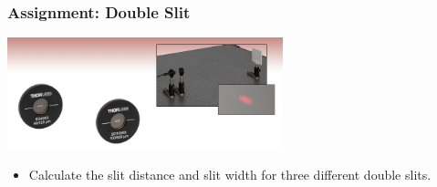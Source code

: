 \documentclass{beamer}
\begin{document}
\begin{frame}\frametitle{Assignment: Double Slit}

\begin{center}
\includegraphics[width=8cm]{fig/thorDouble.jpg}
\end{center}

\vspace{1cm}

\begin{itemize}
\item Calculate the slit distance and slit width for three different double slits. 
\end{itemize}

\end{frame}
\end{document}
